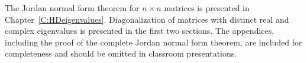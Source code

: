 \documentclass{ximera}
\begin{document}
The Jordan normal form theorem for $n\times n$ matrices is presented in 
Chapter~\ref{C:HDeigenvalues}.  Diagonalization of matrices with distinct
real and complex eigenvalues is presented in the first two sections.  The
appendices, including the proof of the complete Jordan normal form theorem,
are included for completeness and should be omitted in classroom
presentations.


\end{document}
